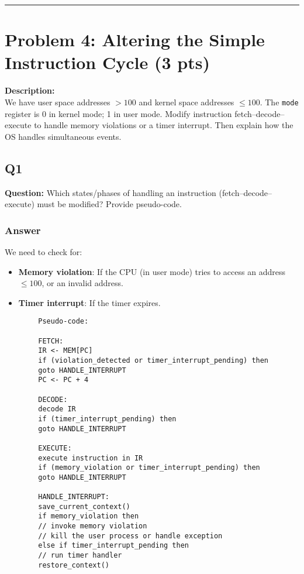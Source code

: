\documentclass[12pt]{article}
\begin{document}
	\hrule
	\vspace{0.5cm}
	
	\section{Problem 4: Altering the Simple Instruction Cycle (3 pts)}
	\textbf{Description:} \\
	We have user space addresses $> 100$ and kernel space addresses $\leq 100$. The \texttt{mode} register is 0 in kernel mode; 1 in user mode. Modify instruction fetch--decode--execute to handle memory violations or a timer interrupt. Then explain how the OS handles simultaneous events.
	
	\subsection*{Q1}
	\textbf{Question:} Which states/phases of handling an instruction (fetch--decode--execute) must be modified? Provide pseudo-code.
	
	\subsubsection*{Answer}
	We need to check for:
	\begin{itemize}
		\item \textbf{Memory violation}: If the CPU (in user mode) tries to access an address $\leq 100$, or an invalid address.
		\item \textbf{Timer interrupt}: If the timer expires.
	\end{itemize}
	
	\begin{verbatim}
		Pseudo-code:
		
		FETCH:
		IR <- MEM[PC]
		if (violation_detected or timer_interrupt_pending) then
		goto HANDLE_INTERRUPT
		PC <- PC + 4
		
		DECODE:
		decode IR
		if (timer_interrupt_pending) then
		goto HANDLE_INTERRUPT
		
		EXECUTE:
		execute instruction in IR
		if (memory_violation or timer_interrupt_pending) then
		goto HANDLE_INTERRUPT
		
		HANDLE_INTERRUPT:
		save_current_context()
		if memory_violation then
		// invoke memory violation
		// kill the user process or handle exception
		else if timer_interrupt_pending then
		// run timer handler
		restore_context()
	\end{verbatim}
	
\end{document}

